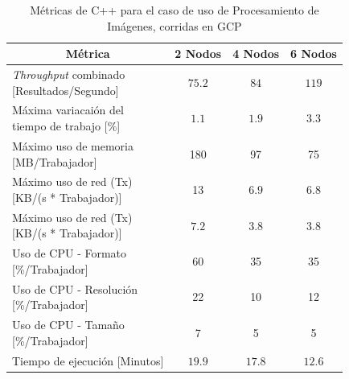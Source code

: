\documentclass[11pt]{article}
\providecommand{\row}[1]{\parbox{150pt}{\setlength{\baselineskip}{0.2\baselineskip}\strut#1\strut}}
\newcommand{\ipcap}[2]{\caption{Métricas de #1 para el caso de uso de Procesamiento de Imágenes, corridas en #2}}
\newcommand{\english}[1]{\textit{#1}}
\begin{document}
\begin{table}[H]
\centering
\begin{tabular}{|l|c|c|c|}
\hline
\multicolumn{1}{|c|}{Métrica} & 2 Nodos & 4 Nodos & 6 Nodos \\ \hline
\row{\english{Throughput} combinado\\{[Resultados/Segundo]}} & $75.2$ & $84$ & $119$ \\ \hline
\row{Máxima variacaión del \\ tiempo de trabajo {[}\%{]}} & $1.1$ & $1.9$ & $3.3$ \\ \hline
\row{Máximo uso de memoria \\ {[MB/Trabajador]}} & 180 & 97 & 75 \\ \hline
\row{Máximo uso de red (Tx) \\ {[KB/(s * Trabajador)]}} & 13 & $6.9$ & $6.8$ \\ \hline
\row{Máximo uso de red (Tx) \\ {[KB/(s * Trabajador)]}} & $7.2$ & $3.8$ & $3.8$ \\ \hline
\row{Uso de CPU - Formato\\{[\%/Trabajador]}} & 60 & 35 & 35 \\ \hline
\row{Uso de CPU - Resolución\\{[\%/Trabajador]}} & 22 & 10 & 12 \\ \hline
\row{Uso de CPU - Tamaño\\{[\%/Trabajador]}} & 7 & 5 & 5 \\ \hline
Tiempo de ejecución [Minutos] & $19.9$ & $17.8$ & $12.6$ \\ \hline
\end{tabular}
\ipcap{C++}{GCP}
\end{table}
\end{document}
